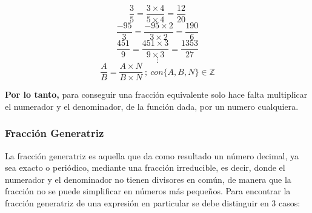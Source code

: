         $$\frac{3}{5} =\frac{3\times4}{5\times4} = \frac{12}{20} $$
        $$\frac{-95}{3} = \frac{-95\times2}{3\times2} =\frac{190}{6} $$
        $$\frac{451}{9} = \frac{451\times3}{9\times3} =	\frac{1353}{27} $$
        $$\vdots$$
        $$\frac{A}{B} = \frac{A\times N}{B\times N}\ ;\ con \{A,B,N \} \in \mathbb{Z}$$

    \textbf{Por lo tanto,} para conseguir una fracción equivalente solo hace falta
    multiplicar el numerador y el denominador, de la función dada, por un numero cualquiera.



\subsubsection*{Fracción Generatriz}
    La fracción generatriz es aquella que da como resultado un número decimal,
    ya sea exacto o periódico, mediante una fracción irreducible, es decir,
    donde el numerador y el denominador no tienen divisores en común, de manera
    que la fracción no se puede simplificar en números más pequeños. Para
    encontrar la fracción generatriz de una expresión en particular se debe
    distinguir en 3 casos:

